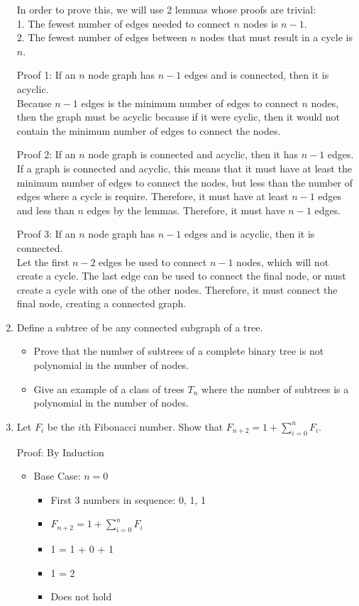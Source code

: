 \documentclass[12pt]{article}
\begin{document}
\begin{enumerate}
In order to prove this, we will use 2 lemmas whose proofs are trivial:\\
1. The fewest number of edges needed to connect $n$ nodes is $n-1$.\\
2. The fewest number of edges between $n$ nodes that must result in a cycle is
$n$.

Proof 1: If an $n$ node graph has $n-1$ edges and is connected, then it is
acyclic.\\
Because $n-1$ edges is the minimum number of edges to connect $n$ nodes, then
the graph must be acyclic because if it were cyclic, then it would not contain
the minimum number of edges to connect the nodes.

Proof 2: If an $n$ node graph is connected and acyclic, then it has $n-1$
edges.\\
If a graph is connected and acyclic, this means that it must have at least the
minimum number of edges to connect the nodes, but less than the number of edges
where a cycle is require. Therefore, it must have at least $n-1$ edges and less
than $n$ edges by the lemmas. Therefore, it must have $n-1$ edges.

Proof 3: If an $n$ node graph has $n-1$ edges and is acyclic, then it is
connected.\\
Let the first $n-2$ edges be used to connect $n-1$ nodes, which will not create
a cycle. The last edge can be used to connect the final node, or must create a
cycle with one of the other nodes. Therefore, it must connect the final node,
creating a connected graph.

\item Define a subtree of be any connected subgraph of a tree.
    \begin{itemize}
        \item Prove that the number of subtrees of a complete binary tree is not
            polynomial in the number of nodes.
        \item Give an example of a class of trees ${T_n}$ where the number of
            subtrees is a polynomial in the number of nodes.
    \end{itemize}

\item Let $F_i$ be the $i$th Fibonacci number. Show that $F_{n+2} = 1 +
    \sum_{i=0}^n F_i$.

    Proof: By Induction\\
    \begin{itemize}
        \item Base Case: $n=0$
        \begin{itemize}
            \item First 3 numbers in sequence: 0, 1, 1
            \item $F_{n+2} = 1 + \sum_{i=0}^n F_i$
            \item 1 = 1 + 0 + 1
            \item 1 = 2
            \item Does not hold
        \end{itemize}
    \end{itemize}


\end{enumerate}
\end{document}
